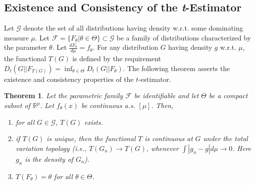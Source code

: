 \documentclass{article}
\newtheorem{thm}{Theorem}
\begin{document}
\subsection{Existence and Consistency of the \textit{t}-Estimator}
Let $\mathcal{G}$ denote the set of all distributions having density w.r.t. some dominating measure $\mu$.
Let $\mathcal{F}=\{F_\theta|\theta \in \Theta\} \subset \mathcal{G}$ be a family of distributions characterized by the parameter $\theta$. Let $\frac{d F_\theta}{d \mu}=f_\theta$. For any distribution $G$ having density $g$ w.r.t. $\mu$, the functional $T(G)$ is defined by the requirement $D_t(G||F_{T(G)})=\inf_{\theta \in \Theta} D_t(G||F_\theta).$
The following theorem asserts the existence and consistency properties of the $t$-estimator.
\begin{thm}
Let the parametric family $\mathcal{F}$ be identifiable and let $\Theta$ be a compact subset of $\mathbb{R}^p$. Let $f_\theta(x)$ be continuous a.s. $[\mu]$. Then,
\begin{enumerate}
    \item for all $G \in \mathcal{G}$, $T(G)$ exists.
    \item if $T(G)$ is unique, then the functional $T$ is continuous at $G$ under the total variation topology \Big(i.e., $T(G_n) \to T(G)$, whenever $\int|g_n-g|d\mu \to 0$. Here $g_n$ is the density of $G_n$\Big). 
    \item $T(F_\theta)=\theta$ for all $\theta \in \Theta$.
\end{enumerate}
\end{thm}
\end{document}
